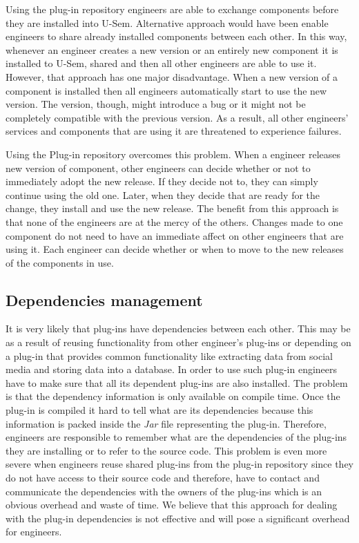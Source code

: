 Using the plug-in repository engineers are able to exchange components before they are installed into U-Sem. Alternative approach would have been enable engineers to share already installed components between each other. In this way, whenever an engineer creates a new version or an entirely new component it is installed to U-Sem, shared and then all other engineers are able to use it. However, that approach has one major disadvantage. When a new version of a component is installed then all engineers automatically start to use the new version. The version, though, might introduce a bug or it might not be completely compatible with the previous version. As a result, all other engineers' services and components that are using it are threatened to experience failures. 

Using the Plug-in repository overcomes this problem. When a engineer releases new version of component, other engineers can decide whether or not to immediately adopt the new release. If they decide not to, they can simply continue using the old one. 
Later, when they decide that are ready for the change, they install and use the new release. The benefit from this approach is that none of the engineers are at the mercy of the others. Changes made to one component do not need to have an immediate affect on other engineers that are using it. Each engineer can decide whether or when to move to the new releases of the components in use.

\subsection{Dependencies management}

It is very likely that plug-ins have dependencies between each other. This may be as a result of reusing functionality from other engineer's plug-ins or depending on a plug-in that provides common functionality like extracting data from social media and storing data into a database. In order to use such plug-in engineers have to make sure that all its dependent plug-ins are also installed. The problem is that the dependency information is only available on compile time. Once the plug-in is compiled it hard to tell what are its dependencies because this information is packed inside the \textit{Jar} file representing the plug-in. Therefore, engineers are responsible to remember what are the dependencies of the plug-ins they are installing or to refer to the source code. This problem is even more severe when engineers reuse shared plug-ins from the plug-in repository since they do not have access to their source code and therefore, have to contact and communicate the dependencies with the owners of the plug-ins which is an obvious overhead and waste of time. We believe that this approach for dealing with the plug-in dependencies is not effective and will pose a significant overhead for engineers.

